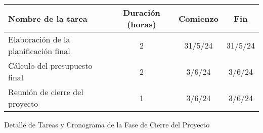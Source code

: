 \begin{planificacion}
	\centering
	\begin{tabular}{ | m{9cm} | c | c | c | }
		\hline
		\textbf{Nombre de la tarea}           & \textbf{Duración (horas)} & \textbf{Comienzo} & \textbf{Fin} \\\hline
		Elaboración de la planificación final & 2                         & 31/5/24           & 31/5/24      \\\hline
		Cálculo del presupuesto final         & 2                         & 3/6/24            & 3/6/24       \\\hline
		Reunión de cierre del proyecto        & 1                         & 3/6/24            & 3/6/24       \\\hline
	\end{tabular}
	\caption{Detalle de Tareas y Cronograma de la Fase de Cierre del Proyecto}
\end{planificacion}
